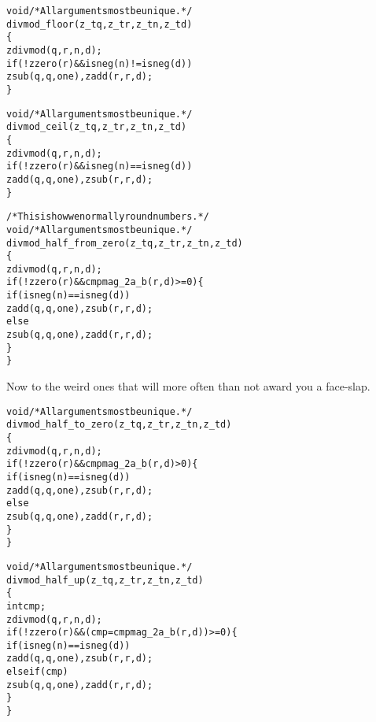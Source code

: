 \begin{alltt}
   void \textcolor{c}{/* \textrm{All arguments most be unique.} */}
   divmod_floor(z_t q, z_t r, z_t n, z_t d)
   \{
       zdivmod(q, r, n, d);
       if (!zzero(r) && isneg(n) != isneg(d))
           zsub(q, q, one), zadd(r, r, d);
   \}
\end{alltt}

\begin{alltt}
   void \textcolor{c}{/* \textrm{All arguments most be unique.} */}
   divmod_ceil(z_t q, z_t r, z_t n, z_t d)
   \{
       zdivmod(q, r, n, d);
       if (!zzero(r) && isneg(n) == isneg(d))
           zadd(q, q, one), zsub(r, r, d);
   \}
\end{alltt}

\begin{alltt}
   /* \textrm{This is how we normally round numbers.} */
   void \textcolor{c}{/* \textrm{All arguments most be unique.} */}
   divmod_half_from_zero(z_t q, z_t r, z_t n, z_t d)
   \{
       zdivmod(q, r, n, d);
       if (!zzero(r) && cmpmag_2a_b(r, d) >= 0) \{
           if (isneg(n) == isneg(d))
               zadd(q, q, one), zsub(r, r, d);
           else
               zsub(q, q, one), zadd(r, r, d);
       \}
   \}
\end{alltt}

\noindent
Now to the weird ones that will more often than
not award you a face-slap. %

\begin{alltt}
   void \textcolor{c}{/* \textrm{All arguments most be unique.} */}
   divmod_half_to_zero(z_t q, z_t r, z_t n, z_t d)
   \{
       zdivmod(q, r, n, d);
       if (!zzero(r) && cmpmag_2a_b(r, d) > 0) \{
           if (isneg(n) == isneg(d))
               zadd(q, q, one), zsub(r, r, d);
           else
               zsub(q, q, one), zadd(r, r, d);
       \}
   \}
\end{alltt}

\begin{alltt}
   void \textcolor{c}{/* \textrm{All arguments most be unique.} */}
   divmod_half_up(z_t q, z_t r, z_t n, z_t d)
   \{
       int cmp;
       zdivmod(q, r, n, d);
       if (!zzero(r) && (cmp = cmpmag_2a_b(r, d)) >= 0) \{
           if (isneg(n) == isneg(d))
               zadd(q, q, one), zsub(r, r, d);
           else if (cmp)
               zsub(q, q, one), zadd(r, r, d);
       \}
   \}
\end{alltt}

